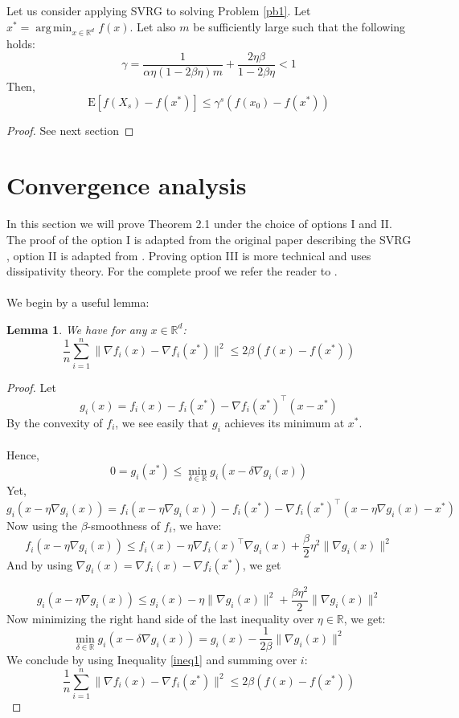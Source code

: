 \documentclass[12pt]{report}
\newtheorem{lemma}{Lemma}[section]
\newcounter{theo}[section]
\newenvironment{theo}[2][]{%
    \refstepcounter{theo}
\newcommand*{\defeq}{\mathrel{\vcenter{\baselineskip0.5ex \lineskiplimit0pt
                     \hbox{\scriptsize.}\hbox{\scriptsize.}}}%
                     =} 
 
\begin{mdframed}[]\relax}{%
\end{mdframed}}
\newcommand{\E}{\mathrm{E}}
\DeclareMathOperator*\argmin{arg\,min}
\begin{document}
\begin{theo}
LLet us consider applying SVRG to solving Problem \ref{pb1}.
Let $x^*=\argmin_{x\in\mathbb{R}^d} f(x)$.
Let also $m$ be sufficiently large such that the following holds:
\begin{equation}
    \gamma=\frac{1}{\alpha\eta(1-2\beta\eta)m}+\frac{2\eta\beta}{1-2\beta\eta}<1
\end{equation}   
Then,
\begin{equation}
    \E[f(X_s)-f(x^*)]\leq \gamma^s(f(x_0)-f(x^*))
\end{equation}


\end{theo}
\begin{proof}
See next section
\end{proof}
\section{Convergence analysis}

In this section we will prove Theorem 2.1 under the choice of options I and II. The proof of the option I is adapted from  the original paper describing the SVRG \cite{johnson2013accelerating}, option II is adapted from \cite{bubeck2015convex}. Proving option III is more technical and uses dissipativity theory. For the complete proof we refer the reader to \cite{hu2018dissipativity}.\\
\\We begin by a useful lemma:
\begin{lemma}\label{lemma1}
We have for any $x\in\mathbb{R}^d$:
$$\frac{1}{n}\sum_{i=1}^n\|\nabla f_i(x)-\nabla f_i(x^*)\|^2\leq 2\beta(f(x)-f(x^*))$$
\end{lemma}

\begin{proof}
Let 
$$g_i(x)=f_i(x)-f_i(x^*)-\nabla f_i(x^*)^\top(x-x^*)$$
By the convexity of $f_i$, we see easily that $g_i$ achieves its minimum at $x^*$.\\
\\Hence, 
\begin{equation}\label{ineq1}
0=g_i(x^*)\leq \min_{\delta\in\mathbb{R}} g_i\left(x-\delta\nabla g_i(x)\right)
\end{equation}
Yet, $g_i\left(x-\eta\nabla g_i(x)\right)=f_i(x-\eta\nabla g_i(x))-f_i(x^*)-\nabla f_i(x^*)^\top(x-\eta\nabla g_i(x)-x^*)$\\

Now using the $\beta$-smoothness of $f_i$, we have:
$$f_i\left(x-\eta\nabla g_i(x)\right)\leq f_i(x) -\eta\nabla f_i(x)^\top\nabla g_i(x)+\frac{\beta}{2}\eta^2\|\nabla g_i(x)\|^2$$
And by using  
$\nabla g_i(x)=\nabla f_i(x)-\nabla f_i(x^*) $, we get

$$g_i\left(x-\eta\nabla g_i(x)\right)\leq g_i(x)-\eta\|\nabla g_i(x) \|^2+\frac{\beta\eta^2}{2}\|\nabla g_i(x)\|^2 $$
Now minimizing the right hand side of the last inequality over $\eta\in\mathbb{R}$, we get:
$$ \min_{\delta\in\mathbb{R}} g_i\left(x-\delta\nabla g_i(x)\right)=g_i(x)-\frac{1}{2\beta}\|\nabla g_i(x)\|^2$$
We conclude by using Inequality \ref{ineq1} and summing over $i$:
$$\frac{1}{n}\sum_{i=1}^n\|\nabla f_i(x)-\nabla f_i(x^*)\|^2\leq 2\beta(f(x)-f(x^*))$$
\end{proof}
\end{document}
